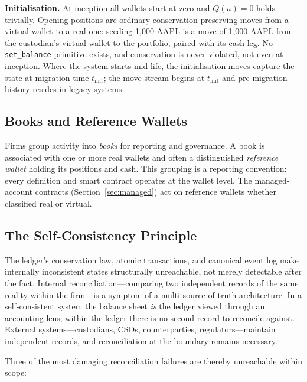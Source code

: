 \noindent\textbf{Initialisation.} At inception all wallets start at zero and $Q(u)=0$ holds trivially. Opening positions are ordinary conservation-preserving moves from a virtual wallet to a real one: seeding 1{,}000 AAPL is a move of 1{,}000 AAPL from the custodian's virtual wallet to the portfolio, paired with its cash leg. No \texttt{set\_balance} primitive exists, and conservation is never violated, not even at inception. Where the system starts mid-life, the initialisation moves capture the state at migration time $t_{\text{init}}$; the move stream begins at $t_{\text{init}}$ and pre-migration history resides in legacy systems.

\subsection{Books and Reference Wallets}

Firms group activity into \emph{books} for reporting and governance. A book is associated with one or more real wallets and often a distinguished \emph{reference wallet} holding its positions and cash. This grouping is a reporting convention: every definition and smart contract operates at the wallet level. The managed-account contracts (Section~\ref{sec:managed}) act on reference wallets whether classified real or virtual.

\subsection{The Self-Consistency Principle}

\begin{principle}
The ledger's conservation law, atomic transactions, and canonical event log make internally inconsistent states structurally unreachable, not merely detectable after the fact. Internal reconciliation---comparing two independent records of the same reality within the firm---is a symptom of a multi-source-of-truth architecture. In a self-consistent system the balance sheet \emph{is} the ledger viewed through an accounting lens; within the ledger there is no second record to reconcile against. External systems---custodians, CSDs, counterparties, regulators---maintain independent records, and reconciliation at the boundary remains necessary.
\end{principle}

Three of the most damaging reconciliation failures are thereby unreachable within scope:

